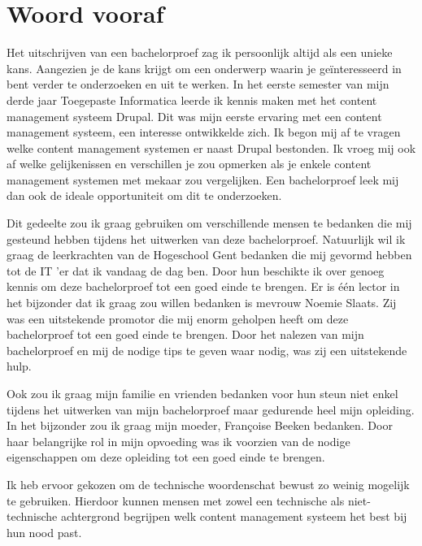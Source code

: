 
\chapter*{Woord vooraf}
\label{ch:voorwoord}


Het uitschrijven van een bachelorproef zag ik persoonlijk altijd als een unieke kans. Aangezien je de kans krijgt om een onderwerp waarin je geïnteresseerd in bent verder te onderzoeken en uit te werken. In het eerste semester van mijn derde jaar Toegepaste Informatica leerde ik kennis maken met het content management systeem Drupal. Dit was mijn eerste ervaring met een content management systeem, een interesse ontwikkelde zich. Ik begon mij af te vragen welke content management systemen er naast Drupal bestonden. Ik vroeg mij ook af welke gelijkenissen en verschillen je zou opmerken als je enkele content management systemen met mekaar zou vergelijken. Een bachelorproef leek mij dan ook de ideale opportuniteit om dit te onderzoeken.

Dit gedeelte zou ik graag gebruiken om verschillende mensen te bedanken die mij gesteund hebben tijdens het uitwerken van deze bachelorproef. Natuurlijk wil ik graag de leerkrachten van de Hogeschool Gent bedanken die mij gevormd hebben tot de IT 'er dat ik vandaag de dag ben. Door hun beschikte ik over genoeg kennis om deze bachelorproef tot een goed einde te brengen. Er is één lector in het bijzonder dat ik graag zou willen bedanken is mevrouw Noemie Slaats. Zij was een uitstekende promotor die mij enorm geholpen heeft om deze bachelorproef tot een goed einde te brengen. Door het nalezen van mijn bachelorproef en mij de nodige tips te geven waar nodig, was zij een uitstekende hulp.

Ook zou ik graag mijn familie en vrienden bedanken voor hun steun niet enkel tijdens het uitwerken van mijn bachelorproef maar gedurende heel mijn opleiding. In het bijzonder zou ik graag mijn moeder, Françoise Beeken bedanken. Door haar belangrijke rol in mijn opvoeding was ik voorzien van de nodige eigenschappen om deze opleiding tot een goed einde te brengen.

Ik heb ervoor gekozen om de technische woordenschat bewust zo weinig mogelijk te gebruiken. Hierdoor kunnen mensen met zowel een technische als niet-technische achtergrond begrijpen welk content management systeem het best bij hun nood past.